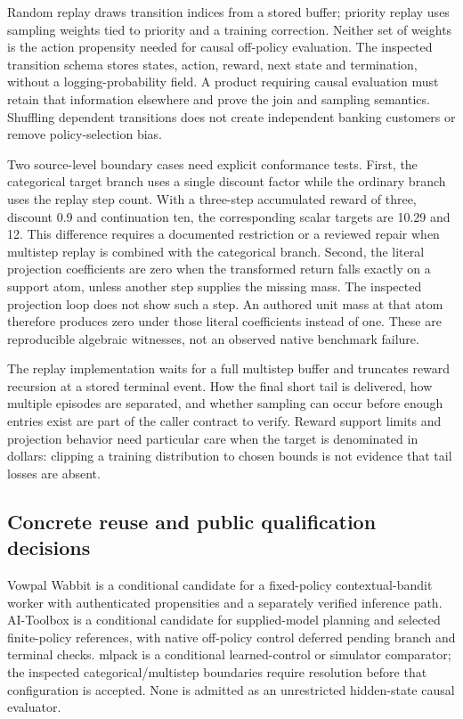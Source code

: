 Random replay draws transition indices from a stored buffer; priority replay uses sampling weights tied to priority and a training correction. Neither set of weights is the action propensity needed for causal off-policy evaluation. The inspected transition schema stores states, action, reward, next state and termination, without a logging-probability field. A product requiring causal evaluation must retain that information elsewhere and prove the join and sampling semantics. Shuffling dependent transitions does not create independent banking customers or remove policy-selection bias.\citep{exec24_policycxx_mlpack,exec24_policycxx_comparison}

Two source-level boundary cases need explicit conformance tests. First, the categorical target branch uses a single discount factor while the ordinary branch uses the replay step count. With a three-step accumulated reward of three, discount 0.9 and continuation ten, the corresponding scalar targets are 10.29 and 12. This difference requires a documented restriction or a reviewed repair when multistep replay is combined with the categorical branch. Second, the literal projection coefficients are zero when the transformed return falls exactly on a support atom, unless another step supplies the missing mass. The inspected projection loop does not show such a step. An authored unit mass at that atom therefore produces zero under those literal coefficients instead of one. These are reproducible algebraic witnesses, not an observed native benchmark failure.\citep{exec24_policycxx_mlpack,exec24_policycxx_comparison}

The replay implementation waits for a full multistep buffer and truncates reward recursion at a stored terminal event. How the final short tail is delivered, how multiple episodes are separated, and whether sampling can occur before enough entries exist are part of the caller contract to verify. Reward support limits and projection behavior need particular care when the target is denominated in dollars: clipping a training distribution to chosen bounds is not evidence that tail losses are absent.\citep{exec24_policycxx_mlpack,exec24_policycxx_comparison}

\subsection{Concrete reuse and public qualification decisions}
Vowpal Wabbit is a conditional candidate for a fixed-policy contextual-bandit worker with authenticated propensities and a separately verified inference path. AI-Toolbox is a conditional candidate for supplied-model planning and selected finite-policy references, with native off-policy control deferred pending branch and terminal checks. mlpack is a conditional learned-control or simulator comparator; the inspected categorical/multistep boundaries require resolution before that configuration is accepted. None is admitted as an unrestricted hidden-state causal evaluator.\citep{exec24_policycxx_comparison}

